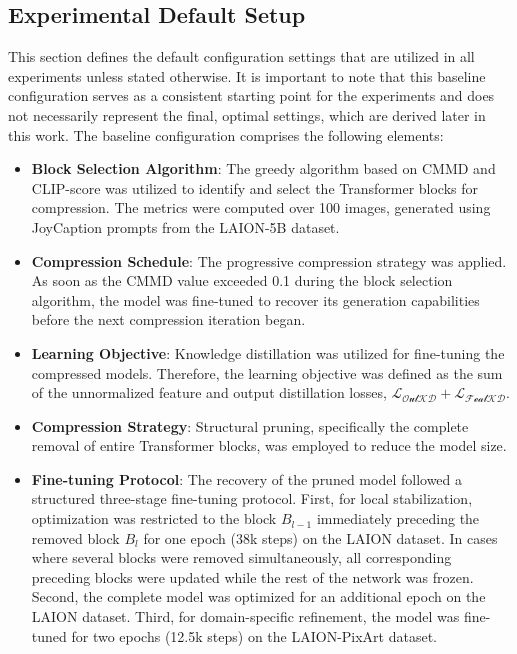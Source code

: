 \subsection{Experimental Default Setup}
\label{sec:DefaultSetup}
This section defines the default configuration settings that are utilized in all experiments unless stated otherwise. It is important to note that this baseline configuration serves as a consistent starting point for the experiments and does not necessarily represent the final, optimal settings, which are derived later in this work. The baseline configuration comprises the following elements:

\begin{itemize}
		\item \textbf{Block Selection Algorithm}: The greedy algorithm based on \gls{CMMD} and \gls{CLIP}-score was utilized to identify and select the Transformer blocks for compression. The metrics were computed over 100 images, generated using JoyCaption prompts from the LAION-5B dataset.
		
	\item \textbf{Compression Schedule}: The progressive compression strategy was applied. As soon as the \gls{CMMD} value exceeded 0.1 during the block selection algorithm, the model was fine-tuned to recover its generation capabilities before the next compression iteration began.
	
	\item \textbf{Learning Objective}: Knowledge distillation was utilized for fine-tuning the compressed models. Therefore, the learning objective was defined as the sum of the unnormalized feature and output distillation losses,  $\mathcal{L_\text{OutKD}} + \mathcal{L_\text{FeatKD}}$.
	
	\item \textbf{Compression Strategy}: Structural pruning, specifically the complete removal of entire Transformer blocks, was employed to reduce the model size.
	
		\item  \textbf{Fine-tuning Protocol}: The recovery of the pruned model followed a structured three-stage fine-tuning protocol. First, for local stabilization, optimization was restricted to the block $B_{l-1}$ immediately preceding the removed block $B_l$ for one epoch (38k steps) on the LAION dataset. In cases where several blocks were removed simultaneously, all corresponding preceding blocks were updated while the rest of the network was frozen. Second, the complete model was optimized for an additional epoch on the LAION dataset. Third, for domain-specific refinement, the model was fine-tuned for two epochs (12.5k steps) on the LAION-PixArt dataset.  
		

\end{itemize}
